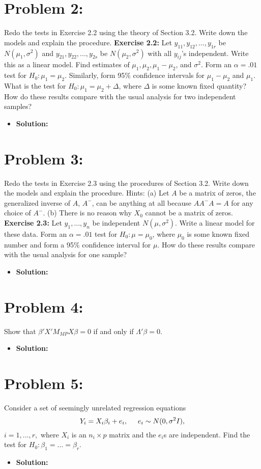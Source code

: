 \documentclass[11pt]{article}
\begin{document}
\section*{Problem 2:}  Redo the tests in Exercise 2.2 using the theory of Section 3.2.  Write down the models and explain the procedure.  {\bf Exercise 2.2:}  Let $y_{11},y_{12},...,y_{1r}$ be $N(\mu_1,\sigma^2)$ and $y_{21},y_{22},...,y_{2s}$ be $N(\mu_2,\sigma^2)$ with all $y_{ij}$'s independent.  Write this as a linear model.  Find estimates of $\mu_1,\mu_2,\mu_1-\mu_2$, and $\sigma^2$.  Form an $\alpha = .01$ test for $H_0\colon \mu_1 = \mu_2$.  Similarly, form 95$\%$ confidence intervals for $\mu_1-\mu_2$ and $\mu_1$.  What is the test for $H_0\colon\mu_1 = \mu_2 + \Delta$, where $\Delta$ is some known fixed quantity?  How do these results compare with the usual analysis for two independent samples?
\begin{itemize}
\item[] {\bf Solution:}
\end{itemize}

\section*{Problem 3:}  Redo the tests in Exercise 2.3 using the procedures of Section 3.2.  Write down the models and explain the procedure.  Hints:  (a) Let $A$ be a matrix of zeros, the generalized inverse of $A$, $A^-$, can be anything at all because $AA^-A = A$ for any choice of $A^-$.  (b) There is no reason why $X_0$ cannot be a matrix of zeros.  {\bf Exercise 2.3:}  Let $y_1,...,y_n$ be independent $N(\mu,\sigma^2)$.  Write a linear model for these data.  Form an $\alpha = .01$ test for $H_0\colon \mu=\mu_0$, where $\mu_0$ is some known fixed number and form a 95$\%$ confidence interval for $\mu$.  How do these results compare with the usual analysis for one sample?
\begin{itemize}
\item[] {\bf Solution:}
\end{itemize}

\section*{Problem 4:}  Show that $\beta'X'M_{MP}X\beta = 0$ if and only if $\Lambda'\beta = 0$.
\begin{itemize}
\item[] {\bf Solution:}
\end{itemize}

\section*{Problem 5:}  Consider a set of seemingly unrelated regression equations
\[
Y_i = X_i\beta_i + e_i, \hspace{5mm} e_i\sim N(0,\sigma^2I),
\]
$i = 1,...,r,$ where $X_i$ is an $n_i\times p$ matrix and the $e_i$s are independent.  Find the test for $H_0\colon \beta_1=...=\beta_r$.
\begin{itemize}
\item[] {\bf Solution:}
\end{itemize}
\end{document}
